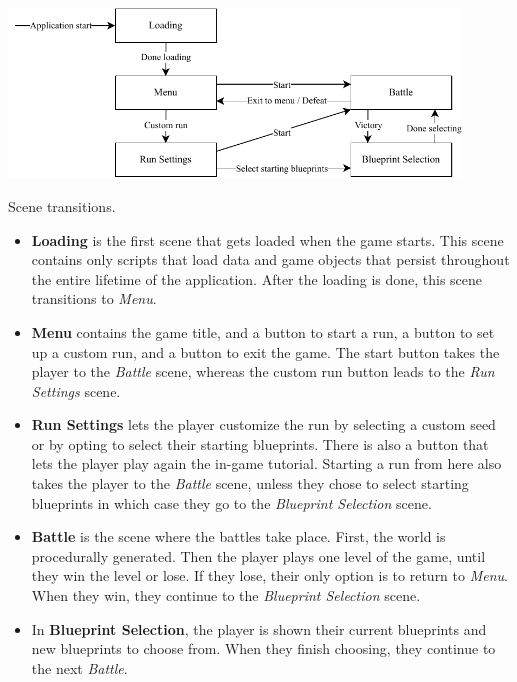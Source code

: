 \begin{center}
    \captionsetup{type=figure}
    \includegraphics[width=0.9\textwidth]{img/Scene transitions.pdf}
    \caption{Scene transitions.}
    \label{fig:scene-transitions}
\end{center}

\begin{itemize}
    \item \textbf{Loading} is the first scene that gets loaded when the game starts.
          This scene contains only scripts that load data and game objects that persist throughout the entire lifetime of the application.
          After the loading is done, this scene transitions to \emph{Menu}.
    \item \textbf{Menu} contains the game title, and a button to start a run, a button to set up a custom run, and a button to exit the game.
          The start button takes the player to the \emph{Battle} scene, whereas the custom run button leads to the \emph{Run Settings} scene.
    \item \textbf{Run Settings} lets the player customize the run by selecting a custom seed or by opting to select their starting blueprints.
          There is also a button that lets the player play again the in-game tutorial.
          Starting a run from here also takes the player to the \emph{Battle} scene, unless they chose to select starting blueprints in which case they go to the \emph{Blueprint Selection} scene.
    \item \textbf{Battle} is the scene where the battles take place.
          First, the world is procedurally generated.
          Then the player plays one level of the game, until they win the level or lose.
          If they lose, their only option is to return to \emph{Menu}.
          When they win, they continue to the \emph{Blueprint Selection} scene.
    \item In \textbf{Blueprint Selection}, the player is shown their current blueprints and new blueprints to choose from.
          When they finish choosing, they continue to the next \emph{Battle}.
\end{itemize}

